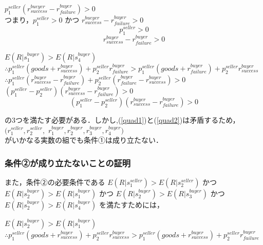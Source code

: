 \documentclass[twocolumn, a4j]{article}
\begin{document}
$ p^{seller}_1 (r^{bueyer}_{success} - r^{buyer}_{failure}) > 0$\\

つまり，$ p^{seller}_1 > 0$ かつ $r^{bueyer}_{success} - r^{buyer}_{failure} > 0$\\

\begin{equation}
   p^{seller}_1 > 0
\end{equation}
\begin{equation}
   \label{quad2}
   r^{buyer}_{success} - r^{buyer}_{failure} > 0
\end{equation}

$ E(R|s^{buyer}_1) > E(R|s^{buyer}_4)$ \\

$\therefore p^{seller}_1 (goods + r^{buyer}_{success}) + p^{seller}_2 r^{buyer}_{failure} > p^{seller}_1 (goods + r^{buyer}_{failure}) + p^{seller}_2 r^{buyer}_{success}$ \\

$\therefore p^{seller}_1(r^{buyer}_{success} - r^{buyer}_{failure}) + p^{seller}_2(r^{buyer}_{failure} - r^{buyer}_{success}) > 0$ \\

$ (p^{seller}_1 - p^{seller}_2)(r^{buyer}_{success} - r^{buyer}_{failure}) > 0$\\

\begin{equation}
\label{quad3}
  (p^{seller}_1 - p^{seller}_2)(r^{buyer}_{success} - r^{buyer}_{failure}) > 0
\end{equation}

の3つを満たす必要がある．しかし,(\ref{quad1})と(\ref{quad2})は矛盾するため，
$(r^{seller}_1, r^{seller}_2, $
$r^{buyer}_1, r^{buyer}_2, r^{buyer}_3, r^{buyer}_4)$ \\
がいかなる実数の組でも条件①は成り立たない． \\


\subsubsection{条件②が成り立たないことの証明}
また，条件②の必要条件である
$E(R|s^{seller}_1)>E(R|s^{seller}_2)$
かつ
$E(R|s^{buyer}_2)>E(R|s^{buyer}_1)$
かつ
$E(R|s^{buyer}_2) > E(R|s^{buyer}_3)$
かつ
$E(R|s^{buyer}_2) > E(R|s^{buyer}_4)$
を満たすためには，

$ E(R|s^{buyer}_2) > E(R|s^{buyer}_1)$ \\

$\therefore p^{seller}_1 (goods + r^{buyer}_{success}) + p^{seller}_2 r^{buyer}_{success} > p^{seller}_1 (goods + r^{buyer}_{success}) + p^{seller}_2 r^{buyer}_{failure}$\\
\end{document}
